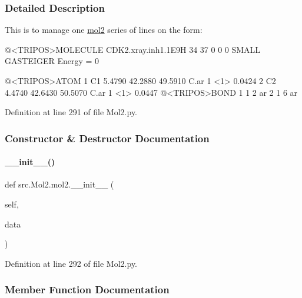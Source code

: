 \subsubsection{Detailed Description}
This is to manage one \hyperlink{classsrc_1_1Mol2_1_1mol2}{mol2} series of lines on the form\+: 

\begin{DoxyVerb} @<TRIPOS>MOLECULE
 CDK2.xray.inh1.1E9H
  34 37 0 0 0
 SMALL
 GASTEIGER
 Energy = 0
 
 @<TRIPOS>ATOM
       1 C1          5.4790   42.2880   49.5910 C.ar    1  <1>         0.0424
       2 C2          4.4740   42.6430   50.5070 C.ar    1  <1>         0.0447
 @<TRIPOS>BOND
      1     1     2   ar
      2     1     6   ar\end{DoxyVerb}
 

Definition at line 291 of file Mol2.\+py.



\subsubsection{Constructor \& Destructor Documentation}
\mbox{\label{classsrc_1_1Mol2_1_1mol2_a7ad6f25ea3ef6bd468e4d684dfd27e07}} 
\paragraph{\texorpdfstring{\+\_\+\+\_\+init\+\_\+\+\_\+()}{\_\_init\_\_()}}
{\footnotesize\ttfamily def src.\+Mol2.\+mol2.\+\_\+\+\_\+init\+\_\+\+\_\+ (\begin{DoxyParamCaption}\item[{}]{self,  }\item[{}]{data }\end{DoxyParamCaption})}



Definition at line 292 of file Mol2.\+py.



\subsubsection{Member Function Documentation}
\mbox{\label{classsrc_1_1Mol2_1_1mol2_a505da0d6fcf8fa95c637ad52b0ddb890}} 
